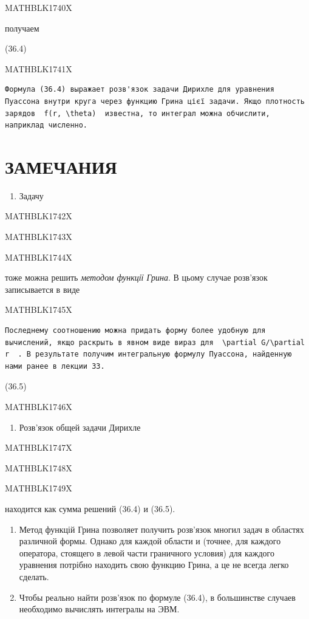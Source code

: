\documentclass[
  ukrainian,
]{article}
\providecommand{\tightlist}{%
  \setlength{\itemsep}{0pt}\setlength{\parskip}{0pt}}
\begin{document}
MATHBLK1740X

получаем

(36.4)

MATHBLK1741X

\begin{verbatim}
Формула (36.4) выражает розв'язок задачи Дирихле для уравнения Пуассона внутри круга через функцию Грина цієї задачи. Якщо плотность зарядов  f(r, \theta)  известна, то интеграл можна обчислити, наприклад численно.
\end{verbatim}

\section{ЗАМЕЧАНИЯ}\label{ux437ux430ux43cux435ux447ux430ux43dux438ux44f-11}

\begin{enumerate}
\def\labelenumi{\arabic{enumi}.}
\tightlist
\item
  Задачу
\end{enumerate}

MATHBLK1742X

MATHBLK1743X

MATHBLK1744X

тоже можна решить \emph{методом функції Грина}. В цьому случае розв'язок
записывается в виде

MATHBLK1745X

\begin{verbatim}
Последнему соотношению можна придать форму более удобную для вычислений, якщо раскрыть в явном виде вираз для  \partial G/\partial r  . В результате получим интегральную формулу Пуассона, найденную нами ранее в лекции 33.
\end{verbatim}

(36.5)

MATHBLK1746X

\begin{enumerate}
\def\labelenumi{\arabic{enumi}.}
\setcounter{enumi}{1}
\tightlist
\item
  Розв'язок общей задачи Дирихле
\end{enumerate}

MATHBLK1747X

MATHBLK1748X

MATHBLK1749X

находится как сумма решений (36.4) и (36.5).

\begin{enumerate}
\def\labelenumi{\arabic{enumi}.}
\setcounter{enumi}{2}
\item
  Метод функцій Грина позволяет получить розв'язок многил задач в
  областях различной формы. Однако для каждой области и (точнее, для
  каждого оператора, стоящего в левой части граничного условия) для
  каждого уравнения потрібно находить свою функцию Грина, а це не всегда
  легко сделать.
\item
  Чтобы реально найти розв'язок по формуле (36.4), в большинстве случаев
  необходимо вычислять интегралы на ЭВМ.
\end{enumerate}
\end{document}
